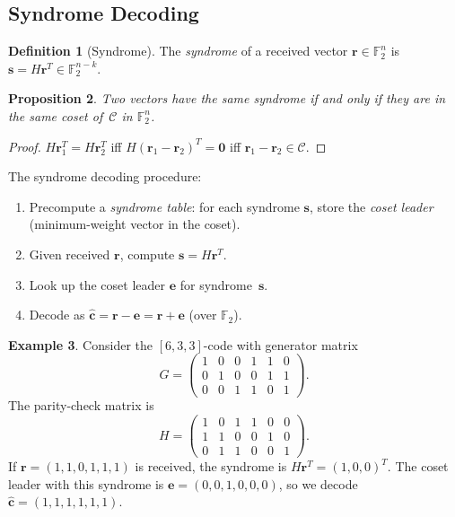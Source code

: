 \documentclass[12pt,a4paper,openany]{book}
\theoremstyle{definition}
\newtheorem{definition}{Definition}[chapter]
\newtheorem{example}[definition]{Example}
\theoremstyle{plain}
\newtheorem{proposition}[definition]{Proposition}
\theoremstyle{remark}
\begin{document}
\subsection{Syndrome Decoding}
\label{ssec:syndrome}

\begin{definition}[Syndrome]
\label{def:syndrome}
The \emph{syndrome} of a received vector $\mathbf{r}\in\mathbb{F}_2^n$
is $\mathbf{s}=H\mathbf{r}^T\in\mathbb{F}_2^{n-k}$.
\end{definition}

\begin{proposition}
\label{prop:syndrome-coset}
Two vectors have the same syndrome if and only if they are in the same
coset of~$\mathcal{C}$ in $\mathbb{F}_2^n$.
\end{proposition}

\begin{proof}
$H\mathbf{r}_1^T=H\mathbf{r}_2^T$ iff
$H(\mathbf{r}_1-\mathbf{r}_2)^T=\mathbf{0}$ iff
$\mathbf{r}_1-\mathbf{r}_2\in\mathcal{C}$.
\end{proof}

The syndrome decoding procedure:
\begin{enumerate}
  \item Precompute a \emph{syndrome table}: for each syndrome
        $\mathbf{s}$, store the \emph{coset leader} (minimum-weight
        vector in the coset).
  \item Given received $\mathbf{r}$, compute
        $\mathbf{s}=H\mathbf{r}^T$.
  \item Look up the coset leader $\mathbf{e}$ for syndrome~$\mathbf{s}$.
  \item Decode as $\hat{\mathbf{c}}=\mathbf{r}-\mathbf{e}
        =\mathbf{r}+\mathbf{e}$ (over $\mathbb{F}_2$).
\end{enumerate}

\begin{example}
\label{ex:syndrome-decode}
Consider the $[6,3,3]$-code with generator matrix
\[
  G=\begin{pmatrix}
    1&0&0&1&1&0\\
    0&1&0&0&1&1\\
    0&0&1&1&0&1
  \end{pmatrix}.
\]
The parity-check matrix is
\[
  H=\begin{pmatrix}
    1&0&1&1&0&0\\
    1&1&0&0&1&0\\
    0&1&1&0&0&1
  \end{pmatrix}.
\]
If $\mathbf{r}=(1,1,0,1,1,1)$ is received, the syndrome is
$H\mathbf{r}^T=(1,0,0)^T$.  The coset leader with this syndrome is
$\mathbf{e}=(0,0,1,0,0,0)$, so we decode
$\hat{\mathbf{c}}=(1,1,1,1,1,1)$.
\end{example}
\end{document}
